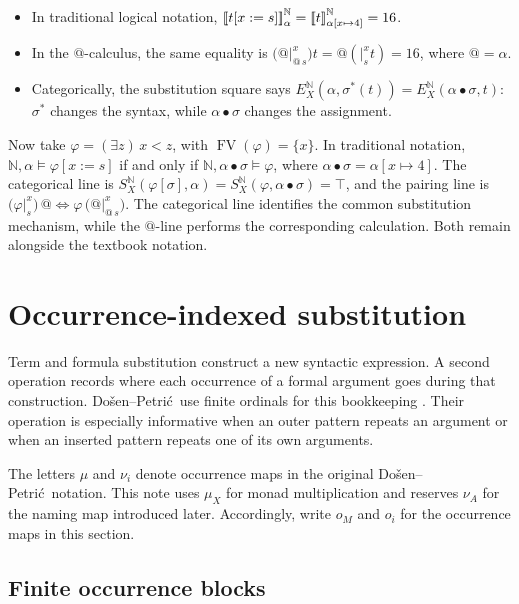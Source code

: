 \documentclass[11pt]{article}
\makeatletter
\newcommand{\llbracket}{\mathopen{[\mkern-3mu[}}
\newcommand{\rrbracket}{\mathclose{]\mkern-3mu]}}
\newcommand{\atsign}{\mathord{@}}
\newcommand{\DP}{Do\v{s}en--Petri\'{c}}
\newcommand{\tightlist}{\setlength{\itemsep}{0pt}%
  \setlength{\parskip}{0pt}}
\makeatother
\begin{document}
\begin{itemize}
\tightlist
\item
  In traditional logical notation,
  \(\llbracket t[x:=s]\rrbracket^{\mathbb N}_\alpha=
  \llbracket t\rrbracket^{\mathbb N}_{\alpha[x\mapsto4]}=16\).
\item
  In the $\atsign$-calculus, the same equality is
  \(\bigl(\atsign\vert_{\atsign\,s}^x\bigr)t
  =\atsign(\vert_s^x t)=16\), where \(\atsign=\alpha\).
\item
  Categorically, the substitution square says
  \(E_X^{\mathbb N}(\alpha,\sigma^*(t))=
  E_X^{\mathbb N}(\alpha\bullet\sigma,t)\): \(\sigma^*\) changes the syntax,
  while \(\alpha\bullet\sigma\) changes the assignment.
\end{itemize}

Now take \(\varphi=(\exists z)\,x<z\), with
\(\operatorname{FV}(\varphi)=\{x\}\). In traditional notation,
\(\mathbb N,\alpha\models\varphi[x:=s]\) if and only if
\(\mathbb N,\alpha\bullet\sigma\models\varphi\), where
\(\alpha\bullet\sigma=\alpha[x\mapsto4]\). The categorical line is
\(S_X^{\mathbb N}(\varphi[\sigma],\alpha)=
S_X^{\mathbb N}(\varphi,\alpha\bullet\sigma)=\top\), and the pairing line is
\(\bigl(\varphi\vert_s^x\bigr)\,\atsign\Longleftrightarrow
\varphi\,\bigl(\atsign\vert_{\atsign\,s}^x\bigr)\). The categorical line identifies the common
substitution mechanism, while the $\atsign$-line performs the corresponding
calculation. Both remain alongside the textbook notation.

\section{Occurrence-indexed substitution}
\label{occurrence-indexed-substitution}

Term and formula substitution construct a new syntactic expression. A second
operation records where each occurrence of a formal argument goes during that
construction. \DP\ use finite ordinals for this bookkeeping
\cite[\S2.5, pp.~45--46]{DPcoherence}. Their operation is especially informative
when an outer pattern repeats an argument or when an inserted pattern repeats
one of its own arguments.

The letters \(\mu\) and \(\nu_i\) denote occurrence maps in the original
\DP\ notation. This note uses \(\mu_X\) for monad multiplication and reserves
\(\nu_A\) for the naming map introduced later. Accordingly, write \(o_M\) and
\(o_i\) for the occurrence maps in this section.

\subsection{Finite occurrence blocks}
\end{document}
